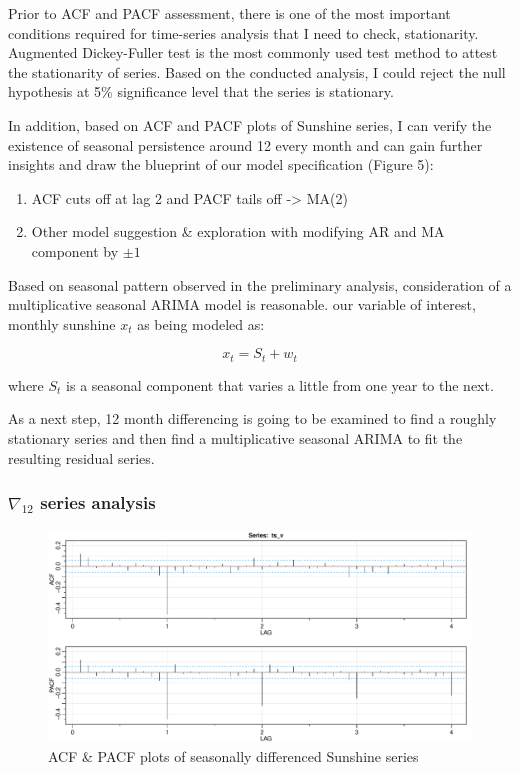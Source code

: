 \documentclass[
  11pt,
]{article}
\providecommand{\tightlist}{%
  \setlength{\itemsep}{0pt}\setlength{\parskip}{0pt}}
\begin{document}
Prior to ACF and PACF assessment, there is one of the most important
conditions required for time-series analysis that I need to check,
stationarity. Augmented Dickey-Fuller test is the most commonly used
test method to attest the stationarity of series. Based on the conducted
analysis, I could reject the null hypothesis at 5\% significance level
that the series is stationary.

In addition, based on ACF and PACF plots of Sunshine series, I can
verify the existence of seasonal persistence around 12 every month and
can gain further insights and draw the blueprint of our model
specification (Figure 5):

\begin{enumerate}
\def\labelenumi{\arabic{enumi}.}
\tightlist
\item
  ACF cuts off at lag 2 and PACF tails off -\textgreater{} MA(2)
\item
  Other model suggestion \& exploration with modifying AR and MA
  component by \(\pm1\)
\end{enumerate}

Based on seasonal pattern observed in the preliminary analysis,
consideration of a multiplicative seasonal ARIMA model is reasonable.
our variable of interest, monthly sunshine \(x_t\) as being modeled as:

\[x_t = S_t + w_t\]

where \(S_t\) is a seasonal component that varies a little from one year
to the next.

As a next step, 12 month differencing is going to be examined to find a
roughly stationary series and then find a multiplicative seasonal ARIMA
to fit the resulting residual series.

\newpage

\hypertarget{nabla_12-series-analysis}{%
\subsubsection{\texorpdfstring{\(\nabla_{12}\) series
analysis}{\textbackslash nabla\_\{12\} series analysis}}\label{nabla_12-series-analysis}}

\begin{figure}
\centering
\includegraphics{ST422_files/figure-latex/unnamed-chunk-10-1.pdf}
\caption{ACF \& PACF plots of seasonally differenced Sunshine series}
\end{figure}
\end{document}
